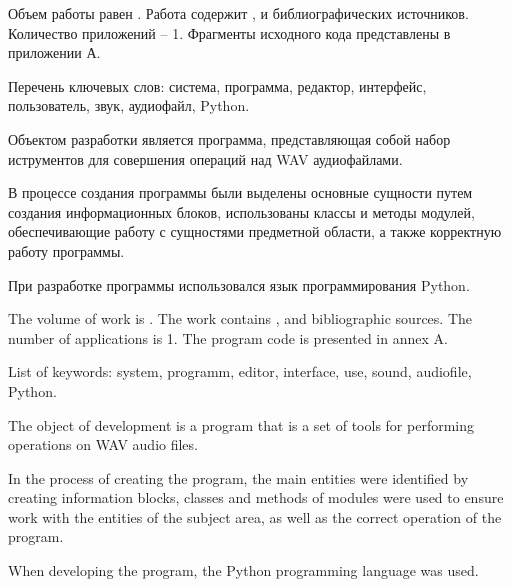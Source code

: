 
Объем работы равен . Работа содержит ,  и  библиографических источников. Количество приложений – 1. Фрагменты исходного кода представлены в приложении А.

Перечень ключевых слов: система, программа, редактор, интерфейс, пользователь, звук, аудиофайл, Python.

Объектом разработки является программа, представляющая собой набор иструментов для совершения операций над WAV аудиофайлами.

В процессе создания программы были выделены основные сущности путем создания информационных блоков, использованы классы и методы модулей, обеспечивающие работу с сущностями предметной области, а также корректную работу программы.

При разработке программы использовался язык программирования Python.

  
The volume of work is . The work contains ,  and  bibliographic sources. The number of applications is 1. The program code is presented in annex A.

List of keywords: system, programm, editor, interface, use, sound, audiofile, Python.

The object of development is a program that is a set of tools for performing operations on WAV audio files.

In the process of creating the program, the main entities were identified by creating information blocks, classes and methods of modules were used to ensure work with the entities of the subject area, as well as the correct operation of the program.

When developing the program, the Python programming language was used.
